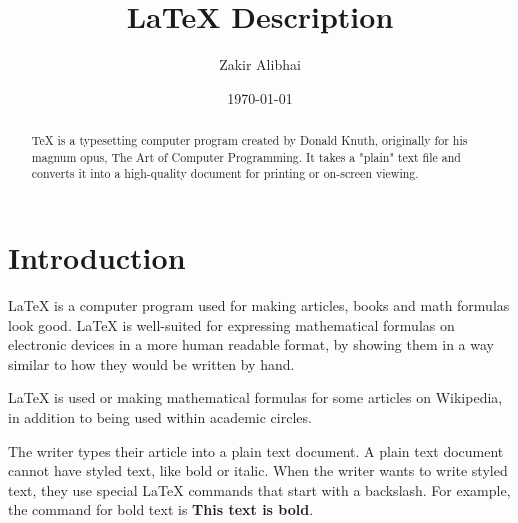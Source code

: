 \documentclass[letterpaper,notitlepage,11pt]{article}
\begin{document}
\title{LaTeX Description}
\author{Zakir Alibhai}
\date{\today}
\maketitle
\begin{abstract}
TeX is a typesetting computer program created by Donald Knuth, originally for his magnum opus, The Art of Computer Programming. It takes a "plain" text file and converts it into a high-quality document for printing or on-screen viewing.
\end{abstract}
\section{Introduction}
LaTeX is a computer program used for making articles, books and math formulas look good. LaTeX is well-suited for expressing mathematical formulas on electronic devices\cite{grinstein} in a more human readable format, by showing them in a way similar to how they would be written by hand.

LaTeX is used or making mathematical formulas for some articles on Wikipedia, in addition to being used within academic circles\cite{soil}.

The writer types their article into a plain text document. A plain text document cannot have styled text, like bold or italic. When the writer wants to write styled text, they use special LaTeX commands that start with a backslash. For example, the command for bold text is \textbf{This text is bold}.



\end{document}

